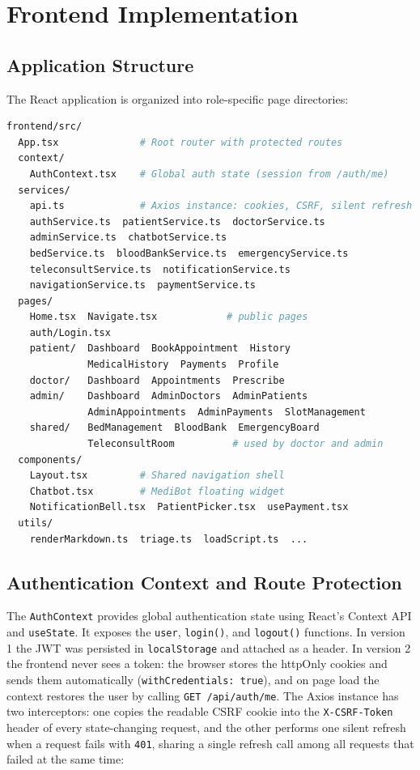 \FloatBarrier
\section{Frontend Implementation}

\FloatBarrier
\subsection{Application Structure}

The React application is organized into role-specific page directories:

\begin{lstlisting}[language=bash, caption=Frontend Directory Structure]
frontend/src/
  App.tsx              # Root router with protected routes
  context/
    AuthContext.tsx    # Global auth state (session from /auth/me)
  services/
    api.ts             # Axios instance: cookies, CSRF, silent refresh
    authService.ts  patientService.ts  doctorService.ts
    adminService.ts  chatbotService.ts
    bedService.ts  bloodBankService.ts  emergencyService.ts
    teleconsultService.ts  notificationService.ts
    navigationService.ts  paymentService.ts
  pages/
    Home.tsx  Navigate.tsx            # public pages
    auth/Login.tsx
    patient/  Dashboard  BookAppointment  History
              MedicalHistory  Payments  Profile
    doctor/   Dashboard  Appointments  Prescribe
    admin/    Dashboard  AdminDoctors  AdminPatients
              AdminAppointments  AdminPayments  SlotManagement
    shared/   BedManagement  BloodBank  EmergencyBoard
              TeleconsultRoom          # used by doctor and admin
  components/
    Layout.tsx         # Shared navigation shell
    Chatbot.tsx        # MediBot floating widget
    NotificationBell.tsx  PatientPicker.tsx  usePayment.tsx
  utils/
    renderMarkdown.ts  triage.ts  loadScript.ts  ...
\end{lstlisting}

\FloatBarrier
\subsection{Authentication Context and Route Protection}

The \texttt{AuthContext} provides global authentication state using React's Context API and \texttt{useState}. It exposes the \texttt{user}, \texttt{login()}, and \texttt{logout()} functions. In version 1 the JWT was persisted in \texttt{localStorage} and attached as a header. In version 2 the frontend never sees a token: the browser stores the httpOnly cookies and sends them automatically (\texttt{withCredentials: true}), and on page load the context restores the user by calling \texttt{GET /api/auth/me}. The Axios instance has two interceptors: one copies the readable CSRF cookie into the \texttt{X-CSRF-Token} header of every state-changing request, and the other performs one silent refresh when a request fails with \texttt{401}, sharing a single refresh call among all requests that failed at the same time:

